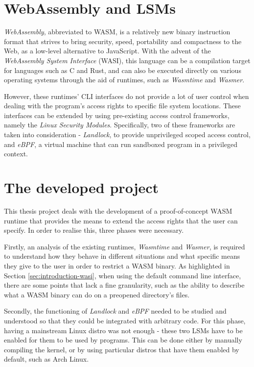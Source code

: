 \section{WebAssembly and LSMs}

\textit{WebAssembly}, abbreviated to WASM, is a relatively new binary instruction format that
strives to bring security, speed, portability and compactness to the Web,
as a low-level alternative to JavaScript.
With the advent of the \textit{WebAssembly System Interface} (WASI),
this language can be a compilation target for languages such as C and Rust,
and can also be executed directly on various operating systems
through the aid of runtimes, such as \textit{Wasmtime} and \textit{Wasmer}.

However, these runtimes' CLI interfaces do not provide a lot of user control
when dealing with the program's access rights to specific file system locations.
These interfaces can be extended by using pre-existing access control frameworks,
namely the \textit{Linux Security Modules}.
Specifically, two of these frameworks are taken into consideration - \textit{Landlock},
to provide unprivileged scoped access control, and \textit{eBPF}, a virtual
machine that can run sandboxed program in a privileged context.

\section{The developed project}

This thesis project deals with the development of a proof-of-concept WASM runtime that
provides the means to extend the access rights that the user can specify.
In order to realise this, three phases were necessary.

Firstly, an analysis of the existing runtimes, \textit{Wasmtime} and \textit{Wasmer},
is required to understand how they behave in different situations and what
specific means they give to the user in order to restrict a WASM binary.
As highlighted in Section \ref{sec:introduction-wasi}, when using the default command line
interface, there are some points that lack a fine granularity, such as the ability
to describe what a WASM binary can do on a preopened directory's files.

Secondly, the functioning of \textit{Landlock} and \textit{eBPF} needed to be studied and understood
so that they could be integrated with arbitrary code.
For this phase, having a mainstream Linux distro was not enough - these two LSMs have to be enabled
for them to be used by programs. This can be done either by manually compiling the kernel,
or by using particular distros that have them enabled by default, such as Arch Linux.

